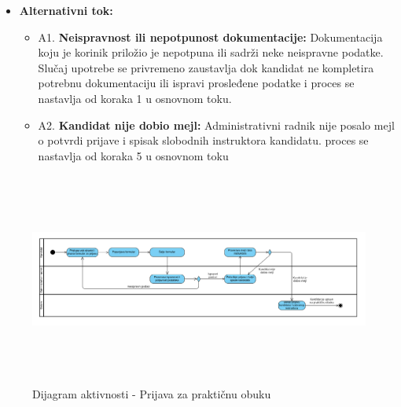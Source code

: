 \begin{itemize}
\item \textbf{Alternativni tok:}  
   \begin{itemize}
   \item A1. \textbf{Neispravnost ili nepotpunost dokumentacije:}
  Dokumentacija koju je korinik priložio je nepotpuna ili sadrži neke neispravne podatke. Slučaj upotrebe se privremeno zaustavlja dok kandidat ne kompletira potrebnu dokumentaciju ili ispravi prosleđene podatke i proces se nastavlja od koraka 1 u osnovnom toku.
  \item A2. \textbf{Kandidat nije dobio mejl:}
  Administrativni radnik nije posalo mejl o potvrdi prijave i spisak slobodnih instruktora kandidatu. proces se nastavlja od koraka 5 u osnovnom toku
   \end{itemize}

\end{itemize}  

\begin{figure}[H]
  \begin{center}
      \includegraphics[width=140mm, height=70mm]{Diagrams/dijagram_aktivnosti_prijava_za_prakticnu_obuku.png}
  \end{center}
  \caption {Dijagram aktivnosti - Prijava za praktičnu obuku}
  \label{activity_prijava_za_prakticnu_obuku}

\end{figure}
